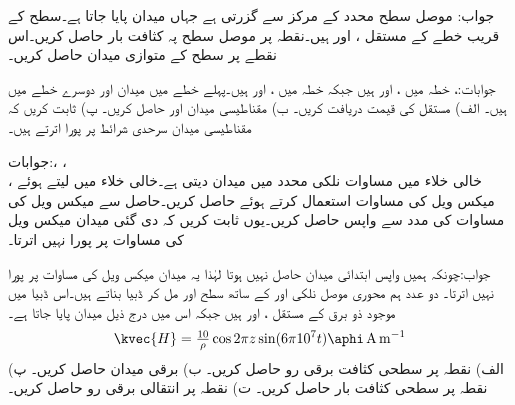 جواب:
موصل سطح محدد کے مرکز سے گزرتی ہے جہاں میدان  پایا جاتا ہے۔سطح کے قریب خطے کے مستقل ،  اور  ہیں۔نقطہ  پر موصل سطح پہ کثافت بار حاصل کریں۔اس نقطے پر سطح کے متوازی میدان حاصل کریں۔

جوابات:، 
خطہ  میں ،  اور  ہیں جبکہ خطہ  میں ،  اور  ہیں۔پہلے خطے میں میدان  اور دوسرے خطے میں  ہیں۔ الف) مستقل  کی قیمت دریافت کریں۔ ب) مقناطیسی میدان  اور  حاصل کریں۔ پ) ثابت کریں کہ مقناطیسی میدان سرحدی شرائط پر پورا اترتے ہیں۔

جوابات:، ،\\
  ،
خالی خلاء میں مساوات  نلکی محدد میں میدان دیتی ہے۔خالی خلاء میں  لیتے ہوئے میکس ویل کی مساوات  استعمال کرتے ہوئے  حاصل کریں۔حاصل  سے میکس ویل کی مساوات  کی مدد سے  واپس  حاصل کریں۔یوں ثابت کریں کہ دی گئی میدان میکس ویل کی مساوات پر پورا نہیں اترتا۔ 

جواب:چونکہ ہمیں واپس ابتدائی میدان حاصل نہیں ہوتا لہٰذا یہ میدان میکس ویل کی مساوات پر پورا نہیں اترتا۔
دو عدد ہم محوری موصل نلکی  اور   کے ساتھ سطح   اور  مل کر ڈبیا بناتے ہیں۔اس ڈبیا میں موجود ذو برق کے مستقل ،  اور  ہیں جبکہ اس میں درج ذیل میدان پایا جاتا ہے۔
\begin{align*}
\kvec{H}=\tfrac{10}{\rho}\cos 2\pi z \sin (6\pi 10^7 t) \aphi \, \si{\ampere\per\meter}
\end{align*}
الف) نقطہ  پر سطحی کثافت برقی رو حاصل کریں۔ ب) برقی میدان  حاصل کریں۔ پ) نقطہ  پر سطحی کثافت بار حاصل کریں۔ ت) نقطہ  پر انتقالی برقی رو حاصل کریں۔

